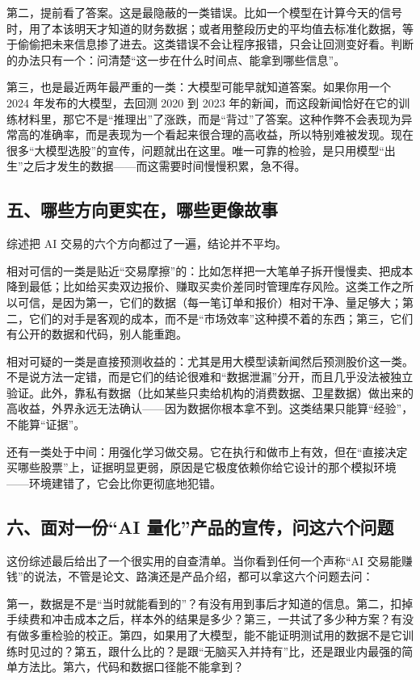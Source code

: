 \documentclass[11pt,a4paper]{ctexart}
\begin{document}
第二，提前看了答案。这是最隐蔽的一类错误。比如一个模型在计算今天的信号时，用了本该明天才知道的财务数据；或者用整段历史的平均值去标准化数据，等于偷偷把未来信息掺了进去。这类错误不会让程序报错，只会让回测变好看。判断的办法只有一个：问清楚“这一步在什么时间点、能拿到哪些信息”。

第三，也是最近两年最严重的一类：大模型可能早就知道答案。如果你用一个 2024 年发布的大模型，去回测 2020 到 2023 年的新闻，而这段新闻恰好在它的训练材料里，那它不是“推理出”了涨跌，而是“背过”了答案。这种作弊不会表现为异常高的准确率，而是表现为一个看起来很合理的高收益，所以特别难被发现。现在很多“大模型选股”的宣传，问题就出在这里。唯一可靠的检验，是只用模型“出生”之后才发生的数据——而这需要时间慢慢积累，急不得。

\subsection*{五、哪些方向更实在，哪些更像故事}

综述把 AI 交易的六个方向都过了一遍，结论并不平均。

相对可信的一类是贴近“交易摩擦”的：比如怎样把一大笔单子拆开慢慢卖、把成本降到最低；比如给买卖双边报价、赚取买卖价差同时管理库存风险。这类工作之所以可信，是因为第一，它们的数据（每一笔订单和报价）相对干净、量足够大；第二，它们的对手是客观的成本，而不是“市场效率”这种摸不着的东西；第三，它们有公开的数据和代码，别人能重跑。

相对可疑的一类是直接预测收益的：尤其是用大模型读新闻然后预测股价这一类。不是说方法一定错，而是它们的结论很难和“数据泄漏”分开，而且几乎没法被独立验证。此外，靠私有数据（比如某些只卖给机构的消费数据、卫星数据）做出来的高收益，外界永远无法确认——因为数据你根本拿不到。这类结果只能算“经验”，不能算“证据”。

还有一类处于中间：用强化学习做交易。它在执行和做市上有效，但在“直接决定买哪些股票”上，证据明显更弱，原因是它极度依赖你给它设计的那个模拟环境——环境建错了，它会比你更彻底地犯错。

\subsection*{六、面对一份“AI 量化”产品的宣传，问这六个问题}

这份综述最后给出了一个很实用的自查清单。当你看到任何一个声称“AI 交易能赚钱”的说法，不管是论文、路演还是产品介绍，都可以拿这六个问题去问：

第一，数据是不是“当时就能看到的”？有没有用到事后才知道的信息。第二，扣掉手续费和冲击成本之后，样本外的结果是多少？第三，一共试了多少种方案？有没有做多重检验的校正。第四，如果用了大模型，能不能证明测试用的数据不是它训练时见过的？第五，跟什么比的？是跟“无脑买入并持有”比，还是跟业内最强的简单方法比。第六，代码和数据口径能不能拿到？
\end{document}
